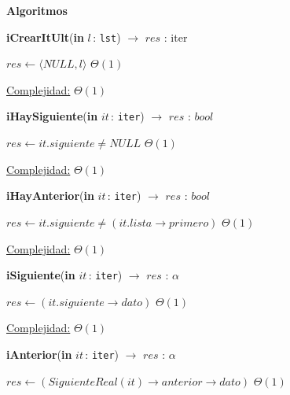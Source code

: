\documentclass[a4paper,10pt]{article}
\let\TipoVariable=\texttt
\let\ModificadorArgumento=\textbf
\newcommand{\In}[2]{\ModificadorArgumento{in} \ensuremath{#1}\,: \TipoVariable{#2}\xspace}
\newenvironment{Algoritmos}{%
  \vspace*{2ex}%
  \noindent\textbf{\Large Algoritmos}%
  \vspace*{2ex}%
}{}
\begin{document}
\begin{Algoritmos}
  
\begin{algorithm}[H]
	\begin{algorithmic}[1]
		\State \textbf{iCrearItUlt}(\In{l}{lst}) $\to$ $res$ : iter
		
			\State $res \gets \langle NULL, l \rangle$	\Comment $\Theta(1)$
    	
		\medskip
		\Statex \underline{Complejidad:} $\Theta(1)$
    \end{algorithmic}
\end{algorithm}	


\begin{algorithm}[H]
	\begin{algorithmic}[1]
		\State \textbf{iHaySiguiente}(\In{it}{iter}) $\to$ $res$ : $bool$
		
			\State $res \gets it.siguiente \neq NULL$	\Comment $\Theta(1)$

			\medskip
			\Statex \underline{Complejidad:} $\Theta(1)$
    	\end{algorithmic}
\end{algorithm}
	
	
\begin{algorithm}[H]	
	\begin{algorithmic}[1]
		\State \textbf{iHayAnterior}(\In{it}{iter}) $\to$ $res$ : $bool$
		
			\State $res \gets it.siguiente \neq (it.lista\rightarrow primero)$	\Comment $\Theta(1)$

			\medskip
			\Statex \underline{Complejidad:} $\Theta(1)$
    	\end{algorithmic}
\end{algorithm}
	
	
\begin{algorithm}[H]
	\begin{algorithmic}[1]
		\State \textbf{iSiguiente}(\In{it}{iter}) $\to$ $res$ : $\alpha$
		
			\State $res \gets (it.siguiente\rightarrow dato)$	\Comment $\Theta(1)$

			\medskip
			\Statex \underline{Complejidad:} $\Theta(1)$
    	\end{algorithmic}
\end{algorithm}
	
	
\begin{algorithm}[H]{\textbf{iAnterior}(\In{it}{iter}) $\to$ $res$ : $\alpha$}
	\begin{algorithmic}[1]	
			\State $res \gets (SiguienteReal(it)\rightarrow anterior\rightarrow dato)$	\Comment $\Theta(1)$


\end{algorithmic}
\end{algorithm}
\end{Algoritmos}
\end{document}
